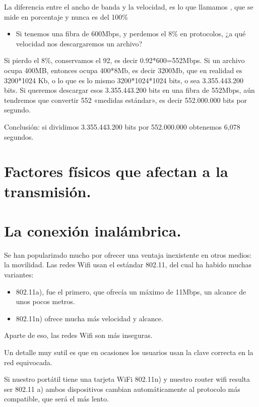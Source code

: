 \documentclass[letterpaper,10pt,spanish]{sphinxmanual}
\begin{document}
La diferencia entre el ancho de banda y la velocidad, es lo que llamamos , que se mide en porcentaje y nunca es del 100\%
\begin{itemize}
\item {} 
Si tenemos una fibra de 600Mbps, y perdemos el 8\% en protocolos, ¿a qué velocidad nos descargaremos un archivo?

\end{itemize}

Si pierdo el 8\%, conservamos el 92, es decir 0.92*600=552Mbps. Si un archivo ocupa 400MB, entonces ocupa 400*8Mb, es decir 3200Mb, que en realidad es 3200*1024 Kb, o lo que es lo mismo 3200*1024*1024 bits, o sea 3.355.443.200 bits. Si queremos descargar esos 3.355.443.200 bits en una fibra de 552Mbps, aún tendremos que convertir 552 «medidas estándar», es decir 552.000.000 bits por segundo.

Conclusión: si dividimos 3.355.443.200 bits por 552.000.000 obtenemos 6,078 segundos.


\section{Factores físicos que afectan a la transmisión.}
\label{\detokenize{t2_integracion_elementos/apuntes_t2:factores-fisicos-que-afectan-a-la-transmision}}

\section{La conexión inalámbrica.}
\label{\detokenize{t2_integracion_elementos/apuntes_t2:la-conexion-inalambrica}}
Se han popularizado mucho por ofrecer una ventaja inexistente en otros medios: la movilidad. Las redes Wifi usan el estándar 802.11, del cual ha habido muchas variantes:
\begin{itemize}
\item {} 
802.11a), fue el primero, que ofrecía un máximo de 11Mbps, un alcance de unos pocos metros.

\item {} 
802.11n) ofrece mucha más velocidad y alcance.

\end{itemize}

Aparte de eso, las redes Wifi son más inseguras.

Un detalle muy sutil es que en ocasiones los usuarios usan la clave correcta en la red equivocada.

Si nuestro portátil tiene una tarjeta WiFi 802.11n) y nuestro router wifi resulta ser 802.11 a) ambos dispositivos cambian automáticamente al protocolo más compatible, que será el más lento.
\end{document}
